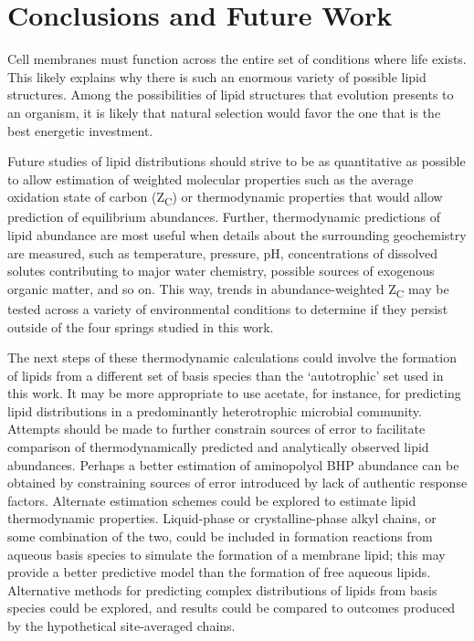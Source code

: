 \chapter[CONCLUSIONS AND FUTURE WORK]{Conclusions and Future Work}

Cell membranes must function across the entire set of conditions where life exists. This likely explains why there is such an enormous variety of possible lipid structures. Among the possibilities of lipid structures that evolution presents to an organism, it is likely that natural selection would favor the one that is the best energetic investment.

Future studies of lipid distributions should strive to be as quantitative as possible to allow estimation of weighted molecular properties such as the average oxidation state of carbon (Z\textsubscript{C}) or thermodynamic properties that would allow prediction of equilibrium abundances. Further, thermodynamic predictions of lipid abundance are most useful when details about the surrounding geochemistry are measured, such as temperature, pressure, pH, concentrations of dissolved solutes contributing to major water chemistry, possible sources of exogenous organic matter, and so on. This way, trends in abundance-weighted Z\textsubscript{C} may be tested across a variety of environmental conditions to determine if they persist outside of the four springs studied in this work.

The next steps of these thermodynamic calculations could involve the formation of lipids from a different set of basis species than the `autotrophic' set used in this work. It may be more appropriate to use acetate, for instance, for predicting lipid distributions in a predominantly heterotrophic microbial community. Attempts should be made to further constrain sources of error to facilitate comparison of thermodynamically predicted and analytically observed lipid abundances. Perhaps a better estimation of aminopolyol BHP abundance can be obtained by constraining sources of error introduced by lack of authentic response factors. Alternate estimation schemes could be explored to estimate lipid thermodynamic properties. Liquid-phase or crystalline-phase alkyl chains, or some combination of the two, could be included in formation reactions from aqueous basis species to simulate the formation of a membrane lipid; this may provide a better predictive model than the formation of free aqueous lipids. Alternative methods for predicting complex distributions of lipids from basis species could be explored, and results could be compared to outcomes produced by the hypothetical site-averaged chains.

